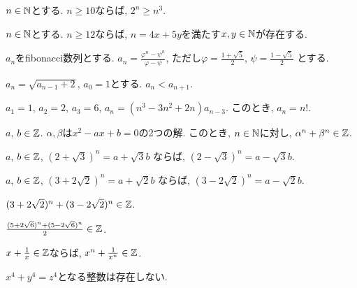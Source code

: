 \begin{prop}
$n\in\mathbb{N}$とする.
  $n\geq 10$ならば, $2^n\geq n^3$.
\end{prop}


\begin{prop}
$n\in\mathbb{N}$とする.
  $n\geq 12$ならば, $n=4x+5y$を満たす$x,y\in\mathbb{N}$が存在する.
\end{prop}


\begin{prop}
  $a_n$をfibonacci数列とする.
  $a_n=\frac{\varphi^n-\psi^n}{\varphi-\psi}$,
  ただし$\varphi=\frac{1+\sqrt{5}}{2}$,
  $\psi=\frac{1-\sqrt{5}}{2}$
  とする.
\end{prop}

\begin{prop}
  $a_n=\sqrt{a_{n-1}+2}$, $a_0=1$とする.
  $a_n<a_{n+1}$.
\end{prop}



\begin{prop}
  $a_1=1$, $a_2=2$, $a_3=6$,
  $a_n=(n^3-3n^2+2n)a_{n-3}$.
  このとき, $a_n=n!$.
\end{prop}



\begin{prop}
  $a$, $b\in\mathbb{Z}$.
  $\alpha, \beta$は$x^2-ax+b=0$の2つの解.
  このとき, $n\in\mathbb{N}$に対し,
  $\alpha^n+\beta^n\in \mathbb{Z}$.
\end{prop}

\begin{prop}
  $a$, $b\in\mathbb{Z}$,  
  $(2+\sqrt{3})^n=a+\sqrt{3}b$
  ならば,
  $(2-\sqrt{3})^n=a-\sqrt{3}b$.
\end{prop}

\begin{prop}
  $a$, $b\in\mathbb{Z}$,  
  $(3+2\sqrt{2})^n=a+\sqrt{2}b$
  ならば,
  $(3-2\sqrt{2})^n=a-\sqrt{2}b$.
\end{prop}


\begin{prop}
  $(3+2\sqrt{2})^n+(3-2\sqrt{2})^n\in\mathbb{Z}$.
\end{prop}

\begin{prop}
  $\frac{(5+2\sqrt{6})^n+(5-2\sqrt{6})^n}{2}\in\mathbb{Z}$.
\end{prop}

\begin{prop}
  $x+\frac{1}{x}\in\mathbb{Z}$ならば, 
  $x^n+\frac{1}{x^n}\in\mathbb{Z}$.
\end{prop}


\begin{prop}
  $x^4+y^4=z^4$となる整数は存在しない.
\end{prop}

